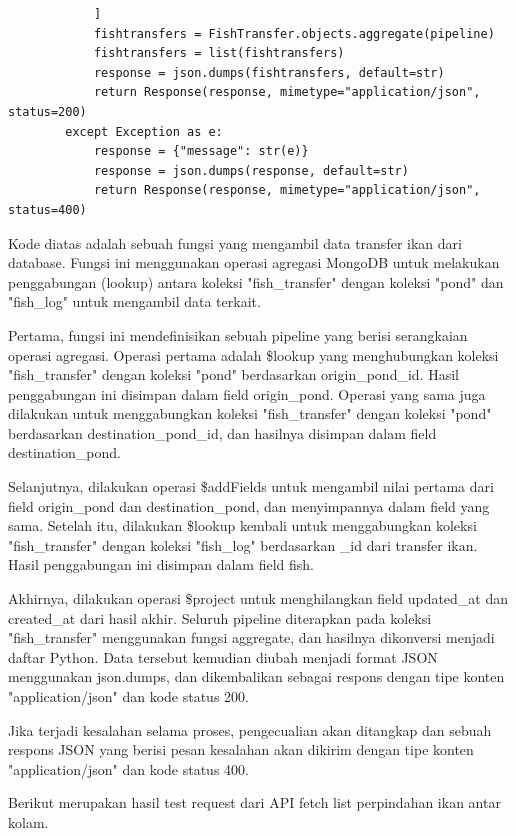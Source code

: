 \begin{enumerate}[1.]
\begin{lstlisting}
            ]
            fishtransfers = FishTransfer.objects.aggregate(pipeline)
            fishtransfers = list(fishtransfers)
            response = json.dumps(fishtransfers, default=str)
            return Response(response, mimetype="application/json", status=200)
        except Exception as e:
            response = {"message": str(e)}
            response = json.dumps(response, default=str)
            return Response(response, mimetype="application/json", status=400)
\end{lstlisting}


Kode diatas adalah sebuah fungsi yang mengambil data transfer ikan dari database. Fungsi ini menggunakan operasi agregasi MongoDB untuk melakukan penggabungan (lookup) antara koleksi "fish\_transfer" dengan koleksi "pond" dan "fish\_log" untuk mengambil data terkait.

Pertama, fungsi ini mendefinisikan sebuah pipeline yang berisi serangkaian operasi agregasi. Operasi pertama adalah \$lookup yang menghubungkan koleksi "fish\_transfer" dengan koleksi "pond" berdasarkan origin\_pond\_id. Hasil penggabungan ini disimpan dalam field origin\_pond. Operasi yang sama juga dilakukan untuk menggabungkan koleksi "fish\_transfer" dengan koleksi "pond" berdasarkan destination\_pond\_id, dan hasilnya disimpan dalam field destination\_pond.

Selanjutnya, dilakukan operasi \$addFields untuk mengambil nilai pertama dari field origin\_pond dan destination\_pond, dan menyimpannya dalam field yang sama. Setelah itu, dilakukan \$lookup kembali untuk menggabungkan koleksi "fish\_transfer" dengan koleksi "fish\_log" berdasarkan \_id dari transfer ikan. Hasil penggabungan ini disimpan dalam field fish.

Akhirnya, dilakukan operasi \$project untuk menghilangkan field updated\_at dan created\_at dari hasil akhir. Seluruh pipeline diterapkan pada koleksi "fish\_transfer" menggunakan fungsi aggregate, dan hasilnya dikonversi menjadi daftar Python. Data tersebut kemudian diubah menjadi format JSON menggunakan json.dumps, dan dikembalikan sebagai respons dengan tipe konten "application/json" dan kode status 200.

Jika terjadi kesalahan selama proses, pengecualian akan ditangkap dan sebuah respons JSON yang berisi pesan kesalahan akan dikirim dengan tipe konten "application/json" dan kode status 400.

Berikut merupakan hasil test request dari API fetch list perpindahan ikan antar kolam.


\end{enumerate}
